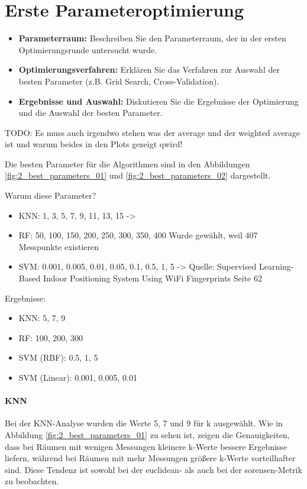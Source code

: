 \section{Erste Parameteroptimierung}
\begin{itemize}
    \item \textbf{Parameterraum:} Beschreiben Sie den Parameterraum, der in der ersten Optimierungsrunde untersucht wurde.
    \item \textbf{Optimierungsverfahren:} Erklären Sie das Verfahren zur Auswahl der besten Parameter (z.B. Grid Search, Cross-Validation).
    \item \textbf{Ergebnisse und Auswahl:} Diskutieren Sie die Ergebnisse der Optimierung und die Auswahl der besten Parameter.
\end{itemize}

TODO: Es muss auch irgendwo stehen was der average und der weighted average ist und warum beides in den Plots gezeigt qwird!

Die besten Parameter für die Algorithmen sind in den Abbildungen \ref{fig:2_best_parameters_01} und \ref{fig:2_best_parameters_02} dargestellt.

Warum diese Parameter?
\begin{itemize}
    \item KNN: 1, 3, 5, 7, 9, 11, 13, 15 -> 
    \item RF: 50, 100, 150, 200, 250, 300, 350, 400 Wurde gewählt, weil 407 Messpunkte existieren
    \item SVM: 0.001, 0.005, 0.01, 0.05, 0.1, 0.5, 1, 5 -> Quelle: Supervised Learning-Based Indoor Positioning System Using WiFi Fingerprints Seite 62
\end{itemize}    

Ergebnisse:

\begin{itemize}
    \item KNN: 5, 7, 9 
    \item RF: 100, 200, 300
    \item SVM (RBF): 0.5, 1, 5
    \item SVM (Linear): 0.001, 0.005, 0.01
\end{itemize}   

\paragraph{KNN}

Bei der KNN-Analyse wurden die Werte 5, 7 und 9 für k ausgewählt. Wie in Abbildung \ref{fig:2_best_parameters_01} zu sehen ist, zeigen die Genauigkeiten, dass bei Räumen mit wenigen Messungen kleinere k-Werte bessere Ergebnisse liefern, während bei Räumen mit mehr Messungen größere k-Werte vorteilhafter sind. Diese Tendenz ist sowohl bei der euclidean- als auch bei der sorensen-Metrik zu beobachten.


